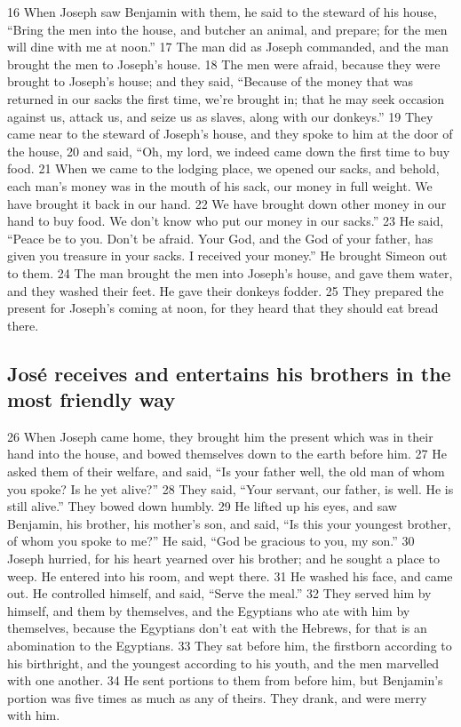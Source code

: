 {16} When Joseph saw Benjamin with them, he said to the steward of his
house, ``Bring the men into the house, and butcher an animal, and
prepare; for the men will dine with me at noon.'' {17} The man did as
Joseph commanded, and the man brought the men to Joseph's house. {18}
The men were afraid, because they were brought to Joseph's house; and
they said, ``Because of the money that was returned in our sacks the
first time, we're brought in; that he may seek occasion against us,
attack us, and seize us as slaves, along with our donkeys.'' {19} They
came near to the steward of Joseph's house, and they spoke to him at the
door of the house, {20} and said, ``Oh, my lord, we indeed came down the
first time to buy food. {21} When we came to the lodging place, we
opened our sacks, and behold, each man's money was in the mouth of his
sack, our money in full weight. We have brought it back in our hand.
{22} We have brought down other money in our hand to buy food. We don't
know who put our money in our sacks.'' {23} He said, ``Peace be to you.
Don't be afraid. Your God, and the God of your father, has given you
treasure in your sacks. I received your money.'' He brought Simeon out
to them. {24} The man brought the men into Joseph's house, and gave them
water, and they washed their feet. He gave their donkeys fodder. {25}
They prepared the present for Joseph's coming at noon, for they heard
that they should eat bread there.

\hypertarget{josuxe9-receives-and-entertains-his-brothers-in-the-most-friendly-way}{%
\subsection{José receives and entertains his brothers in the most
friendly
way}\label{josuxe9-receives-and-entertains-his-brothers-in-the-most-friendly-way}}

{26} When Joseph came home, they brought him the present which was in
their hand into the house, and bowed themselves down to the earth before
him. {27} He asked them of their welfare, and said, ``Is your father
well, the old man of whom you spoke? Is he yet alive?'' {28} They said,
``Your servant, our father, is well. He is still alive.'' They bowed
down humbly. {29} He lifted up his eyes, and saw Benjamin, his brother,
his mother's son, and said, ``Is this your youngest brother, of whom you
spoke to me?'' He said, ``God be gracious to you, my son.'' {30} Joseph
hurried, for his heart yearned over his brother; and he sought a place
to weep. He entered into his room, and wept there. {31} He washed his
face, and came out. He controlled himself, and said, ``Serve the meal.''
{32} They served him by himself, and them by themselves, and the
Egyptians who ate with him by themselves, because the Egyptians don't
eat with the Hebrews, for that is an abomination to the Egyptians. {33}
They sat before him, the firstborn according to his birthright, and the
youngest according to his youth, and the men marvelled with one another.
{34} He sent portions to them from before him, but Benjamin's portion
was five times as much as any of theirs. They drank, and were merry with
him.

